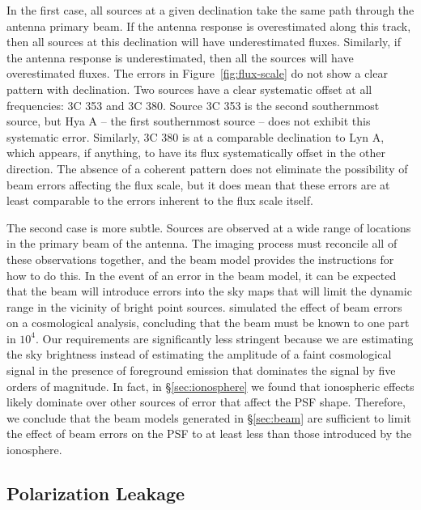 \documentclass[twocolumn]{aastex61}
\begin{document}
In the first case, all sources at a given declination take the same path through the antenna primary
beam. If the antenna response is overestimated along this track, then all sources at this
declination will have underestimated fluxes. Similarly, if the antenna response is underestimated,
then all the sources will have overestimated fluxes. The errors in Figure~\ref{fig:flux-scale} do
not show a clear pattern with declination. Two sources have a clear systematic offset at all
frequencies: 3C 353 and 3C 380. Source 3C 353 is the second southernmost source, but Hya A -- the
first southernmost source -- does not exhibit this systematic error. Similarly, 3C 380 is at a
comparable declination to Lyn A, which appears, if anything, to have its flux systematically offset
in the other direction. The absence of a coherent pattern does not eliminate the possibility of beam
errors affecting the flux scale, but it does mean that these errors are at least comparable to the
errors inherent to the flux scale itself.

The second case is more subtle. Sources are observed at a wide range of locations in the primary
beam of the antenna. The imaging process must reconcile all of these observations together, and the
beam model provides the instructions for how to do this. In the event of an error in the beam model,
it can be expected that the beam will introduce errors into the sky maps that will limit the dynamic
range in the vicinity of bright point sources.  \citet{2015PhRvD..91h3514S} simulated the effect of
beam errors on a cosmological analysis, concluding that the beam must be known to one part in $10^4$.
Our requirements are significantly less stringent because we are estimating the sky brightness
instead of estimating the amplitude of a faint cosmological signal in the presence of foreground
emission that dominates the signal by five orders of magnitude. In fact, in \S\ref{sec:ionosphere}
we found that ionospheric effects likely dominate over other sources of error that affect the PSF
shape. Therefore, we conclude that the beam models generated in \S\ref{sec:beam} are sufficient to
limit the effect of beam errors on the PSF to at least less than those introduced by the ionosphere.

\subsection{Polarization Leakage}
\end{document}
